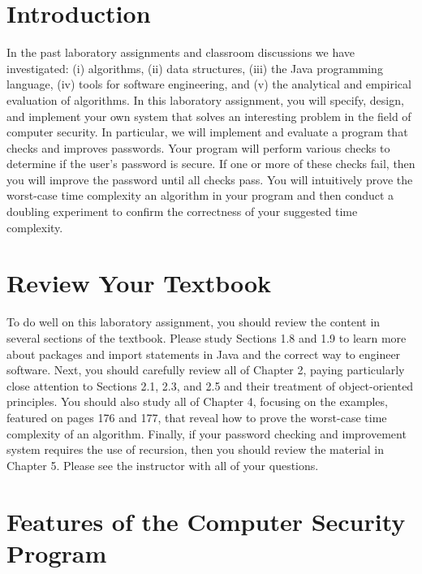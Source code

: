 

\usepackage[compact]{titlesec}


\section*{Introduction}

In the past laboratory assignments and classroom discussions we have investigated: (i) algorithms, (ii) data structures,
(iii) the Java programming language, (iv) tools for software engineering, and (v) the analytical and empirical
evaluation of algorithms. In this laboratory assignment, you will specify, design, and implement your own system that
solves an interesting problem in the field of computer security. In particular, we will implement and evaluate a program
that checks and improves passwords. Your program will perform various checks to determine if the user's password is
secure. If one or more of these checks fail, then you will improve the password until all checks pass. You will
intuitively prove the worst-case time complexity an algorithm in your program and then conduct a doubling experiment to
confirm the correctness of your suggested time complexity.

\section*{Review Your Textbook}

To do well on this laboratory assignment, you should review the content in several sections of the textbook. Please
study Sections 1.8 and 1.9 to learn more about packages and import statements in Java and the correct way to engineer
software. Next, you should carefully review all of Chapter 2, paying particularly close attention to Sections 2.1, 2.3,
and 2.5 and their treatment of object-oriented principles. You should also study all of Chapter 4, focusing on the
examples, featured on pages 176 and 177, that reveal how to prove the worst-case time complexity of an algorithm.
Finally, if your password checking and improvement system requires the use of recursion, then you should review the
material in Chapter 5. Please see the instructor with all of your questions.

\section*{Features of the Computer Security Program}

